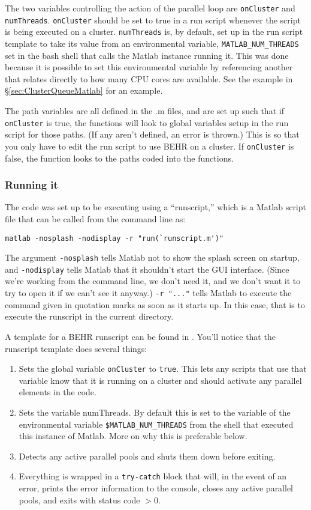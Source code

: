 \documentclass[12pt]{article}
\begin{document}
		The two variables controlling the action of the parallel loop are \texttt{onCluster} and \texttt{numThreads}. \texttt{onCluster} should be set to true in a run script whenever the script is being executed on a cluster.  \texttt{numThreads} is, by default, set up in the run script template to take its value from an environmental variable, \texttt{MATLAB\_NUM\_THREADS} set in the bash shell that calls the Matlab instance running it.  This was done because it is possible to set this environmental variable by referencing another that relates directly to how many CPU cores are available.  See the example in \S\ref{sec:ClusterQueueMatlab} for an example.
		
		The path variables are all defined in the .m files, and are set up such that if \texttt{onCluster} is true, the functions will look to global variables setup in the run script for those paths. (If any aren't defined, an error is thrown.)  This is so that you only have to edit the run script to use BEHR on a cluster.  If \texttt{onCluster} is false, the function looks to the paths coded into the functions.

	\subsubsection{Running it}
		The code was set up to be executing using a ``runscript,'' which is a Matlab script file that can be called from the command line as:
\begin{lstlisting}
matlab -nosplash -nodisplay -r "run(`runscript.m')"
\end{lstlisting}
		The argument \texttt{-nosplash} tells Matlab not to show the splash screen on startup, and \texttt{-nodisplay} tells Matlab that it shouldn't start the GUI interface. (Since we're working from the command line, we don't need it, and we don't want it to try to open it if we can't see it anyway.) \texttt{-r "..."} tells Matlab to execute the command given in quotation marks as soon as it starts up.  In this case, that is to execute the runscript in the current directory.
		
		A template for a BEHR runscript can be found in . You'll notice that the runscript template does several things:
		\begin{enumerate}
			\item Sets the global variable \texttt{onCluster} to \texttt{true}.  This lets any scripts that use that variable know that it is running on a cluster and should activate any parallel elements in the code.
			\item Sets the variable numThreads.  By default this is set to the variable of the environmental variable \texttt{\$MATLAB\_NUM\_THREADS} from the shell that executed this instance of Matlab. More on why this is preferable below.
			\item Detects any active parallel pools and shuts them down before exiting.
			\item Everything is wrapped in a \texttt{try-catch} block that will, in the event of an error, prints the error information to the console, closes any active parallel pools, and exits with status code $> 0$.
		\end{enumerate}
\end{document}
